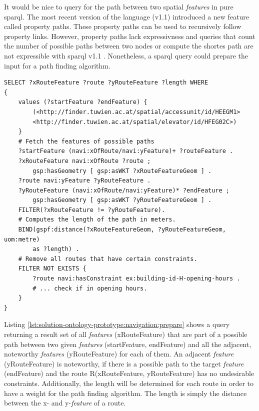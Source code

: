 \documentclass[draft,final]{vutinfth} %
\begin{document}
It would be nice to query for the path between two spatial \textit{features} in pure \gls{sparql}. The most recent version of the language (v1.1) introduced a new feature called property paths. These property paths can be used to recursively follow property links\cite{harris_sparql_2013}. However, property paths lack expressivness and queries that count the number of possible paths between two nodes or compute the shortes path are not expressible with \gls{sparql} v1.1 \cite{reutter_recursion_2015}\cite{atzori_computing_2014}. Nonetheless, a \gls{sparql} query could prepare the input for a path finding algorithm. 

\begin{lstlisting}[language=sparql, frame=single, basicstyle=\footnotesize, caption=Prepare for path finding, label={lst:solution-ontology-prototype:navigation:prepare}]
SELECT ?xRouteFeature ?route ?yRouteFeature ?length WHERE
{
    values (?startFeature ?endFeature) {
    	(<http://finder.tuwien.ac.at/spatial/accessunit/id/HEEGM1> 
    	<http://finder.tuwien.ac.at/spatial/elevator/id/HFEG02C>)
    }
    # Fetch the features of possible paths
    ?startFeature (navi:xOfRoute/navi:yFeature)+ ?routeFeature .
    ?xRouteFeature navi:xOfRoute ?route ;
    	gsp:hasGeometry [ gsp:asWKT ?xRouteFeatureGeom ] .
    ?route navi:yFeature ?yRouteFeature .
    ?yRouteFeature (navi:xOfRoute/navi:yFeature)* ?endFeature ;
      	gsp:hasGeometry [ gsp:asWKT ?yRouteFeatureGeom ] .
    FILTER(?xRouteFeature != ?yRouteFeature).
    # Computes the length of the path in meters.
    BIND(gspf:distance(?xRouteFeatureGeom, ?yRouteFeatureGeom, uom:metre)
    	as ?length) .
    # Remove all routes that have certain constraints.
    FILTER NOT EXISTS {
    	?route navi:hasConstraint ex:building-id-H-opening-hours .
    	# ... check if in opening hours.
    }
}
\end{lstlisting}

Listing \ref{lst:solution-ontology-prototype:navigation:prepare} shows a query returning a result set of all \textit{features} (xRouteFeature) that are part of a possible path between two given \textit{features} (startFeature, endFeature) and all the adjacent, noteworthy \textit{features} (yRouteFeature) for each of them. An adjacent \textit{feature} (yRouteFeature) is noteworthy, if there is a possible path to the target \textit{feature} (endFeature) and the route R(xRouteFeature, yRouteFeature) has no undesirable constraints. Additionally, the length will be determined for each route in order to have a weight for the path finding algorithm. The length is simply the distance between the x- and y-\textit{feature} of a route.
\end{document}

